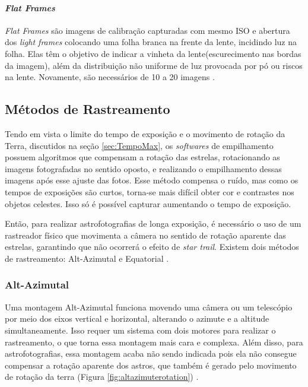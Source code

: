 \paragraph{\textit{Flat Frames}}
\textit{Flat Frames} são imagens de calibração capturadas com mesmo ISO e abertura dos \textit{light frames} colocando uma folha branca na frente da lente, incidindo luz na folha. Elas têm o objetivo de indicar a vinheta da lente(escurecimento nas bordas da imagem), além da distribuição não uniforme de luz provocada por pó ou riscos na lente. Novamente, são necessários de 10 a 20 imagens
\cite{man:deepskystackerfaq}.


\subsection{Métodos de Rastreamento}

Tendo em vista o limite do tempo de exposição e o movimento de rotação da Terra, discutidos na seção \ref{sec:TempoMax}, os \textit{softwares} de empilhamento possuem algoritmos que compensam a rotação das estrelas, rotacionando as imagens fotografadas no sentido oposto, e realizando o empilhamento dessas imagens após esse ajuste das fotos. Esse método compensa o ruído, mas como os tempos de exposições são curtos, torna-se mais difícil obter cor e contrastes nos objetos celestes. Isso só é possível capturar aumentando o tempo de exposição. 

Então, para realizar astrofotografias de longa exposição, é necessário o uso de um rastreador físico que movimenta a câmera no sentido de rotação aparente das estrelas, garantindo que não ocorrerá o efeito de \textit{star trail}. Existem dois métodos de rastreamento: Alt-Azimutal e Equatorial \cite{book:bbcsky}.

\subsubsection{Alt-Azimutal}

Uma montagem Alt-Azimutal funciona movendo uma câmera ou um telescópio por meio dos eixos vertical e horizontal, alterando o azimute e a altitude simultaneamente. Isso requer um sistema com dois motores para realizar o rastreamento, o que torna essa montagem mais cara e complexa. Além disso, para astrofotografias, essa montagem acaba não sendo indicada pois ela não consegue compensar a rotação aparente dos astros, que também é gerado pelo movimento de rotação da terra (Figura \ref{fig:altazimuterotation}) \cite{book:bbcsky}. 

